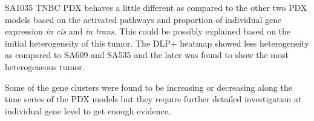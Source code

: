 SA1035 TNBC PDX behaves a little different as compared to the other two PDX models based on the activated pathways and proportion of individual gene expression \textit{in cis} and \textit{in trans}. This could be possibly explained based on the initial heterogeneity of this tumor. The DLP+ heatmap showed less heterogeneity as compared to SA609 and SA535 and the later was found to show the most heterogeneous tumor.

Some of the gene clusters were found to be increasing or decreasing along the time series of the PDX models but they require further detailed investigation at individual gene level to get enough evidence.




















